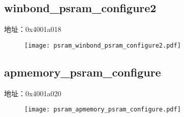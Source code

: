 \subsection{winbond\_psram\_configure2}
\label{psram-winbond-psram-configure2}
地址：0x4001a018
 \begin{figure}[H]
\texttt{[image: psram\_winbond\_psram\_configure2.pdf]}
\end{figure}

\subsection{apmemory\_psram\_configure}
\label{psram-apmemory-psram-configure}
地址：0x4001a020
 \begin{figure}[H]
\texttt{[image: psram\_apmemory\_psram\_configure.pdf]}
\end{figure}


